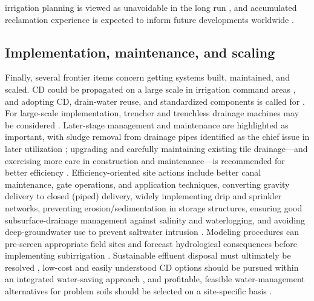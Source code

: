 irrigation planning is viewed as unavoidable in the long run \parencite{Sarwar2001}, and accumulated reclamation experience is expected to inform future developments worldwide \parencite{TeKrony2004}.

\subsection{Implementation, maintenance, and scaling}
Finally, several frontier items concern getting systems built, maintained, and scaled. CD could be propagated on a large scale in irrigation command areas \parencite{Karegoudar2019}, and adopting CD, drain-water reuse, and standardized components is called for \parencite{Gopalakrishnan2007}. For large-scale implementation, trencher and trenchless drainage machines may be considered \parencite{Ritzema2008b}. Later-stage management and maintenance are highlighted as important, with sludge removal from drainage pipes identified as the chief issue in later utilization \parencite{Yan2013b}; upgrading and carefully maintaining existing tile drainage---and exercising more care in construction and maintenance---is recommended for better efficiency \parencite{AbdElMageed2009}. Efficiency-oriented site actions include better canal maintenance, gate operations, and application techniques, converting gravity delivery to closed (piped) delivery, widely implementing drip and sprinkler networks, preventing erosion/sedimentation in storage structures, ensuring good subsurface-drainage management against salinity and waterlogging, and avoiding deep-groundwater use to prevent saltwater intrusion \parencite{Kanber2019}. Modeling procedures can pre-screen appropriate field sites and forecast hydrological consequences before implementing subirrigation \parencite{deWit2024}. Sustainable effluent disposal must ultimately be resolved \parencite{Datta2002}, low-cost and easily understood CD options should be pursued within an integrated water-saving approach \parencite{Wahba2005}, and profitable, feasible water-management alternatives for problem soils should be selected on a site-specific basis \parencite{MOSTAGHIMI1989,Sharma1998}.